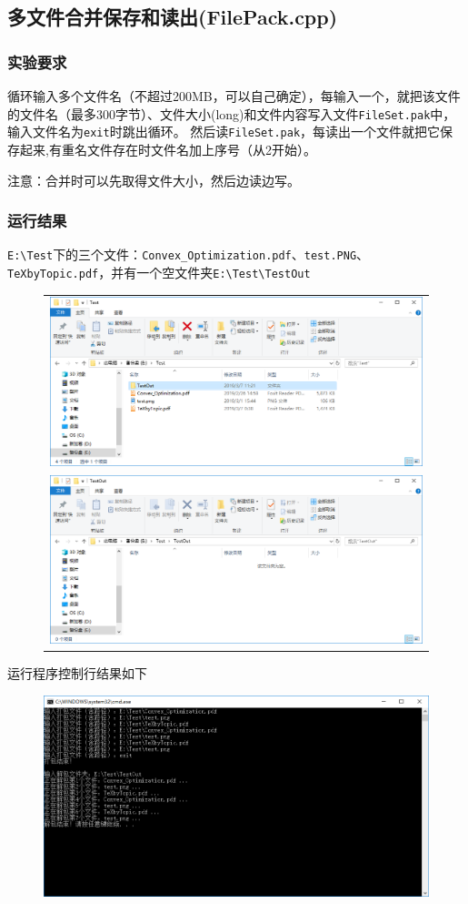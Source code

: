 \documentclass[logo,reportComp]{thesis}
\begin{document}
\subsection{多文件合并保存和读出(FilePack.cpp)}
\subsubsection{实验要求}
循环输入多个文件名（不超过200MB，可以自己确定），每输入一个，就把该文件的文件名（最多300字节）、文件大小(long)和文件内容写入文件\verb'FileSet.pak'中，输入文件名为\verb'exit'时跳出循环。
然后读\verb'FileSet.pak'，每读出一个文件就把它保存起来,有重名文件存在时文件名加上序号（从2开始）。

注意：合并时可以先取得文件大小，然后边读边写。

\subsubsection{运行结果}
\verb'E:\Test'下的三个文件：\verb'Convex_Optimization.pdf'、\verb'test.PNG'、\verb'TeXbyTopic.pdf'，并有一个空文件夹\verb'E:\Test\TestOut'
\begin{figure}[H]
\centering
\begin{tabular}{c}
\includegraphics[width=0.8\linewidth]{fig/FilePack-1.PNG}\\
\includegraphics[width=0.8\linewidth]{fig/FilePack-2.PNG}
\end{tabular}
\end{figure}

运行程序控制行结果如下
\begin{figure}[H]
\centering
\includegraphics[width=0.8\linewidth]{fig/FilePack-3.PNG}
\end{figure}
\end{document}

